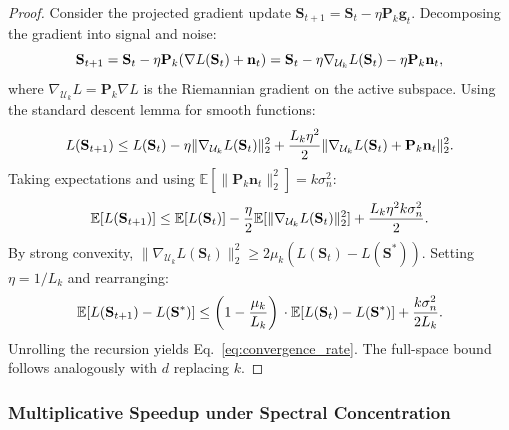 ﻿\documentclass[lettersize,journal]{IEEEtran}
\begin{document}
\begin{proof}
Consider the projected gradient update $\mathbf{S}_{t+1} = \mathbf{S}_t - \eta \mathbf{P}_k \mathbf{g}_t$. Decomposing the gradient into signal and noise:
\begin{equation}
\mathbf{S}_{t+1} = \mathbf{S}_t - \eta \mathbf{P}_k (\nabla L(\mathbf{S}_t) + \mathbf{n}_t) \\\\
= \mathbf{S}_t - \eta \nabla_{\mathcal{U}_k} L(\mathbf{S}_t) - \eta \mathbf{P}_k \mathbf{n}_t,
\end{equation}
where $\nabla_{\mathcal{U}_k} L = \mathbf{P}_k \nabla L$ is the Riemannian gradient on the active subspace. Using the standard descent lemma for smooth functions:
\begin{equation}
L(\mathbf{S}_{t+1}) \leq L(\mathbf{S}_t) - \eta \|\nabla_{\mathcal{U}_k} L(\mathbf{S}_t)\|_2^2 \\\\
+ \frac{L_k \eta^2}{2} \|\nabla_{\mathcal{U}_k} L(\mathbf{S}_t) + \mathbf{P}_k \mathbf{n}_t\|_2^2.
\end{equation}
Taking expectations and using $\mathbb{E}[\|\mathbf{P}_k \mathbf{n}_t\|_2^2] = k \sigma_n^2$:
\begin{equation}
\mathbb{E}[L(\mathbf{S}_{t+1})] \leq \mathbb{E}[L(\mathbf{S}_t)] \\\\
- \frac{\eta}{2} \mathbb{E}[\|\nabla_{\mathcal{U}_k} L(\mathbf{S}_t)\|_2^2] + \frac{L_k \eta^2 k \sigma_n^2}{2}.
\end{equation}
By strong convexity, $\|\nabla_{\mathcal{U}_k} L(\mathbf{S}_t)\|_2^2 \geq 2\mu_k (L(\mathbf{S}_t) - L(\mathbf{S}^*))$. Setting $\eta = 1/L_k$ and rearranging:
\begin{equation}
\mathbb{E}[L(\mathbf{S}_{t+1}) - L(\mathbf{S}^*)] \leq \left(1 - \frac{\mu_k}{L_k}\right) \\\\
\cdot \mathbb{E}[L(\mathbf{S}_t) - L(\mathbf{S}^*)] + \frac{k \sigma_n^2}{2 L_k}.
\end{equation}
Unrolling the recursion yields Eq.~\eqref{eq:convergence_rate}. The full-space bound follows analogously with $d$ replacing $k$.
\end{proof}

\subsubsection{Multiplicative Speedup under Spectral Concentration}
\label{sec:speedup}
\end{document}
